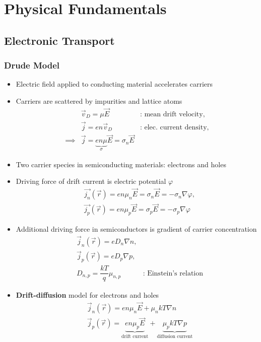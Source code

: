 \section{Physical Fundamentals}
\subsection{Electronic Transport}
\subsubsection{Drude Model}
\begin{itemize}
  \item Electric field applied to conducting material accelerates carriers
  \item Carriers are scattered by impurities and lattice atoms
        \begin{align*}
          &\vec{v}_{D} = \mu \vec{E} &\text{: mean drift velocity},\\
          &\vec{j} = en\vec{v}_{D} &\text{: elec. current density},\\
          \implies&\vec{j} = \underbrace{en\mu}_{\sigma} \vec{E} = \sigma_{n} \vec{E}
        \end{align*}
  \item Two carrier species in semiconducting materials: electrons and holes
  \item Driving force of drift current is electric potential $\varphi$
        \begin{align*}
          &\vec{j_{n}}(\vec{r}) = en\mu_{n}\vec{E} = \sigma_{n}\vec{E} = -\sigma_{n}\nabla\varphi,\\
          &\vec{j_{p}}(\vec{r}) = en\mu_{p}\vec{E} = \sigma_{p}\vec{E} = -\sigma_{p}\nabla\varphi
        \end{align*}
        \item Additional driving force in semiconductors is gradient of carrier concentration
        \begin{align*}
          &\vec{j}_{n}(\vec{r}) = eD_{n}\nabla n,\\
          &\vec{j}_{p}(\vec{r}) = eD_{p}\nabla p,\\
          &D_{n,p} = \dfrac{kT}{q}\mu_{n,p} & \text{: Einstein's relation}
        \end{align*}
  \item \textbf{Drift-diffusion} model for electrons and holes
        \begin{align*}
          &\vec{j}_{n}(\vec{r}) = en\mu_{n}\vec{E} + \mu_{n}kT\nabla n\\
          &\vec{j}_{p}(\vec{r}) = \underbrace{en\mu_{p}\vec{E}}_{\text{drift current}}
          + \underbrace{\mu_{p}kT\nabla p}_{\text{diffusion current}}
        \end{align*}
\end{itemize}

